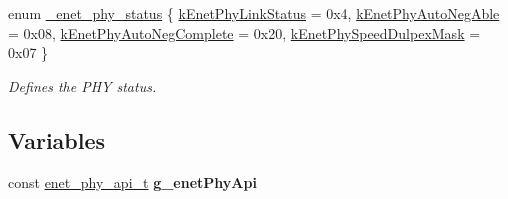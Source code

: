 \begin{DoxyCompactItemize}
\item 
enum \hyperlink{group__phy__driver_ga36e35ce36b105de1638ac99724204790}{\+\_\+enet\+\_\+phy\+\_\+status} \{ \hyperlink{group__phy__driver_gga36e35ce36b105de1638ac99724204790a7bb83f7daa330cbadfa4341c6f5e1549}{k\+Enet\+Phy\+Link\+Status} = 0x4, 
\hyperlink{group__phy__driver_gga36e35ce36b105de1638ac99724204790aa1f63ca7f6496119e9c4348534a3725e}{k\+Enet\+Phy\+Auto\+Neg\+Able} = 0x08, 
\hyperlink{group__phy__driver_gga36e35ce36b105de1638ac99724204790a268b5a9c36a83b819da31b3de23008b8}{k\+Enet\+Phy\+Auto\+Neg\+Complete} = 0x20, 
\hyperlink{group__phy__driver_gga36e35ce36b105de1638ac99724204790abf2375548d142130bd97555e91706a06}{k\+Enet\+Phy\+Speed\+Dulpex\+Mask} = 0x07
 \}\begin{DoxyCompactList}\small\item\em Defines the P\+HY status. \end{DoxyCompactList}
\end{DoxyCompactItemize}
\subsection*{Variables}
\begin{DoxyCompactItemize}
\item 
const \hyperlink{group__phy__driver_ga2ff12f57e0a9d4cec3036656a2895581}{enet\+\_\+phy\+\_\+api\+\_\+t} {\bfseries g\+\_\+enet\+Phy\+Api}\hypertarget{group__phy__driver_ga9fa4ba208c8d7a4b949013ffafd75704}{}\label{group__phy__driver_ga9fa4ba208c8d7a4b949013ffafd75704}

\end{DoxyCompactItemize}
